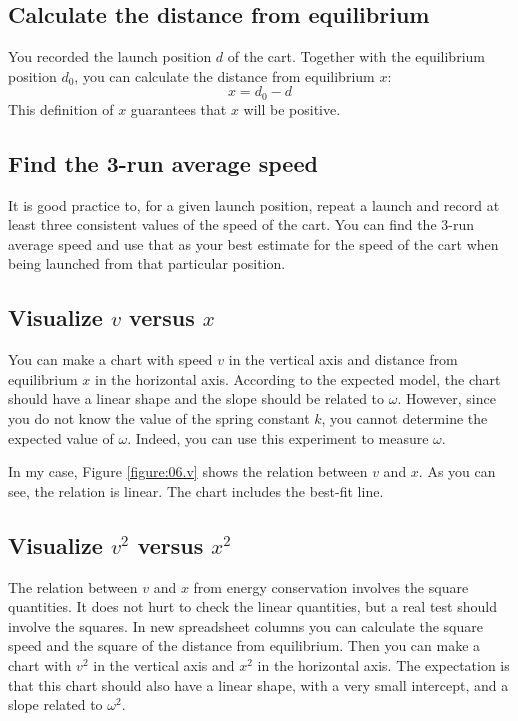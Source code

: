 \subsection{Calculate the distance from equilibrium}
You recorded the launch position $d$ of the cart. Together with the equilibrium position $d_{0}$, you can calculate the distance from equilibrium $x$:
\begin{equation}
    x = d_{0} - d
\end{equation}
This definition of $x$ guarantees that $x$ will be positive.
\subsection{Find the 3-run average speed}
It is good practice to, for a given launch position, repeat a launch and record at least three consistent values of the speed of the cart. You can find the 3-run average speed and use that as your best estimate for the speed of the cart when being launched from that particular position.
\subsection{Visualize $v$ versus $x$}
You can make a chart with speed $v$ in the vertical axis and distance from equilibrium $x$ in the horizontal axis. According to the expected model, the chart should have a linear shape and the slope should be related to $\omega$. However, since you do not know the value of the spring constant $k$, you cannot determine the expected value of $\omega$. Indeed, you can use this experiment to measure $\omega$.

In my case, Figure \ref{figure:06.v} shows the relation between $v$ and $x$. As you can see, the relation is linear. The chart includes the best-fit line.
\subsection{Visualize $v^{2}$ versus $x^{2}$}
The relation between $v$ and $x$ from energy conservation involves the square quantities. It does not hurt to check the linear quantities, but a real test should involve the squares. In new spreadsheet columns you can calculate the square speed and the square of the distance from equilibrium. Then you can make a chart with $v^{2}$ in the vertical axis and $x^{2}$ in the horizontal axis. The expectation is that this chart should also have a linear shape, with a very small intercept, and a slope related to $\omega^{2}$.


